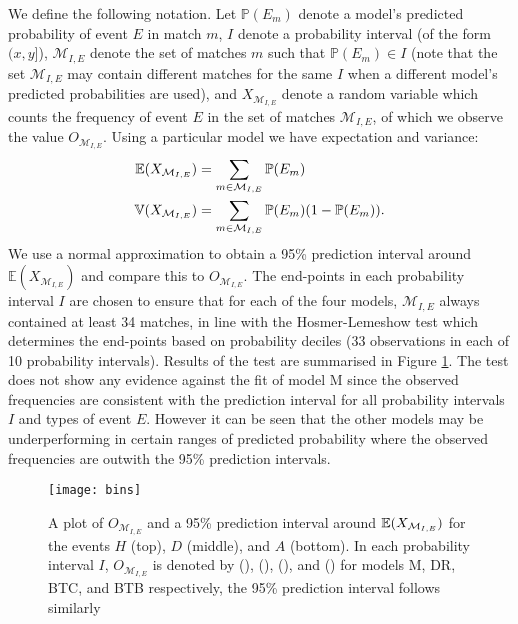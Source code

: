 We define the following notation. Let \(\mathbb{P}(E_m)\) denote a model's predicted probability of event \(E\) in match
\(m\), \(I\) denote a probability interval (of the form \((x, y]\)), \(\mathcal{M}_{I, E}\) denote the set of matches
\(m\) such that \(\mathbb{P}(E_m) \in I\) (note that the set \(\mathcal{M}_{I, E}\) may contain different matches for
the same \(I\) when a different model's predicted probabilities are used), and \(X_{\mathcal{M}_{I, E}}\) denote a
random variable which counts the frequency of event \(E\) in the set of matches \(\mathcal{M}_{I, E}\), of which we
observe the value \(O_{\mathcal{M}_{I, E}}\). Using a particular model we have expectation and variance:
\begin{align} 
\mathbb{E}(X_{\mathcal{M}_{I, E}}) &= \sum_{m \in \mathcal{M}_{I, E}} \mathbb{P}(E_m) \\
\mathbb{V}(X_{\mathcal{M}_{I, E}}) &= \sum_{m \in \mathcal{M}_{I, E}} \mathbb{P}(E_m) (1 - \mathbb{P}(E_m)).
\end{align}
We use a normal approximation to obtain a 95\% prediction interval around \(\mathbb{E}(X_{\mathcal{M}_{I, E}})\) and
compare this to \(O_{\mathcal{M}_{I, E}}\). The end-points in each probability interval \(I\) are chosen to ensure that
for each of the four models, \(\mathcal{M}_{I, E}\) always contained at least 34 matches, in line with the
Hosmer-Lemeshow test which determines the end-points based on probability deciles (33 observations in each of 10
probability intervals). Results of the test are summarised in Figure \ref{bins}. The test does not show any
evidence against the fit of model M since the observed frequencies are consistent with the prediction interval for all
probability intervals \(I\) and types of event \(E\). However it can be seen that the other models may be
underperforming in certain ranges of predicted probability where the observed frequencies are outwith the 95\%
prediction intervals.
\begin{figure}[htp]
\begin{center}
\texttt{[image: bins]}
\caption{A plot of \(O_{\mathcal{M}_{I, E}}\) and a 95\% prediction interval around \(\mathbb{E}(X_{\mathcal{M}_{I,
E}})\) for the events \(H\) (top), \(D\) (middle), and \(A\) (bottom). In each probability interval \(I\),
\(O_{\mathcal{M}_{I, E}}\) is denoted by (\protect\blueFilledCircle), (\protect\redFilledCircle),
(\protect\greenFilledCircle), and (\protect\blackFilledCircle) for models M, DR, BTC, and BTB respectively, the 95\%
prediction interval follows similarly}
\label{bins} 
\end{center}
\end{figure}

